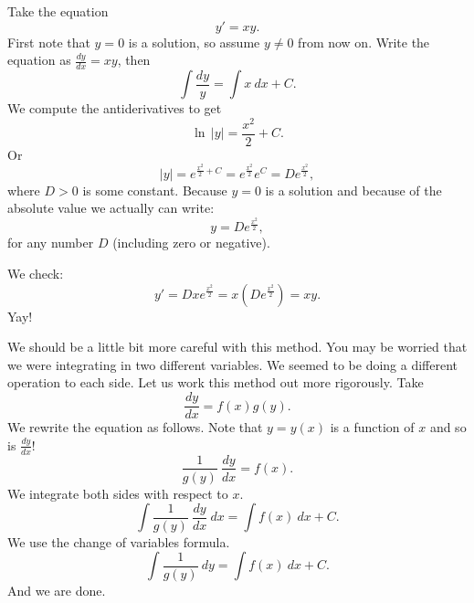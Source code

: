 \documentclass[12pt]{book}
\begin{document}
\begin{example} \label{example:yprimeisxy}
Take the equation
\begin{equation*}
y' = xy .
\end{equation*}
First note that $y=0$ is a solution,
so assume $y \not =0$ from now on.
Write the equation as $\frac{dy}{dx} = xy$, then
\begin{equation*}
\int \frac{dy}{y} = \int x~dx + C .
\end{equation*}
We compute the antiderivatives to get
\begin{equation*}
\ln \, \lvert y\rvert = \frac{x^2}{2} + C .
\end{equation*}
Or
\begin{equation*}
\lvert y \rvert = e^{\frac{x^2}{2} + C} = e^{\frac{x^2}{2}} e^C = D e^{\frac{x^2}{2}} ,
\end{equation*}
where $D > 0$ is some constant.  Because $y=0$ is a solution and because
of the absolute value we actually can write:
\begin{equation*}
y = D e^{\frac{x^2}{2}} ,
\end{equation*}
for any number $D$ (including zero or negative).

We check:
\begin{equation*}
y' = D x e^{\frac{x^2}{2}} = x \left( D e^{\frac{x^2}{2}} \right) = xy .
\end{equation*}
Yay!
\end{example}

We should be a little bit more careful with this method.  You may be worried 
that we were
integrating in two different variables.
We seemed to be
doing a different operation to each side.  Let us work this method out more
rigorously.  Take
\begin{equation*}
\frac{dy}{dx} = f(x)g(y) .
\end{equation*}
We rewrite the equation as follows.
Note that $y = y(x)$ is a function of $x$ and so is
$\frac{dy}{dx}$!
\begin{equation*}
\frac{1}{g(y)}~\frac{dy}{dx} = f(x) .
\end{equation*}
We integrate both sides with respect to $x$.
\begin{equation*}
\int \frac{1}{g(y)}~\frac{dy}{dx} ~dx = \int f(x) ~dx + C .
\end{equation*}
We use the change of variables formula.
\begin{equation*}
\int \frac{1}{g(y)}~dy = \int f(x) ~dx + C .
\end{equation*}
And we are done.
\end{document}
